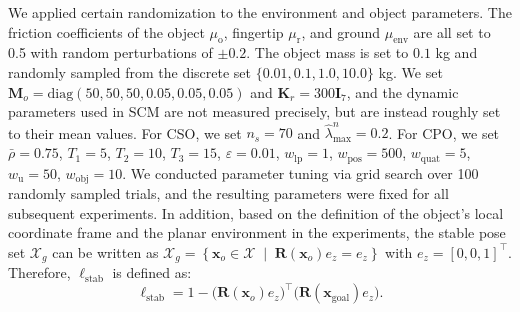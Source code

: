 We applied certain randomization to the environment and object parameters. The friction coefficients of the object $\mu_{\text{o}}$, fingertip $\mu_{\text{r}}$, and ground $\mu_{\text{env}}$ are all set to 0.5 with random perturbations of $\pm 0.2$. The object mass is set to $0.1$ kg and randomly sampled from the discrete set
$\{0.01,0.1,1.0,10.0\}$ kg. We set $\boldsymbol{M}_o=\text{diag}(50,50,50,0.05,0.05,0.05)$ and $\boldsymbol{K}_r=300 \boldsymbol{I}_7$, and the dynamic parameters used in SCM are not measured precisely, but are instead roughly set to their mean values. For CSO, we set $n_s=70$ and $\hat{\lambda}^n_{\text{max}}=0.2$. For CPO, we set $\bar{\rho}=0.75$, $T_1=5$, $T_2=10$, $T_3=15$, $\varepsilon=0.01$, $w_{\text{lp}}=1$, $w_{\text{pos}}=500$, $w_{\text{quat}}=5$, $w_\text{u}=50$, $w_{\text{obj}}=10$. We conducted parameter tuning via grid search over 100 randomly sampled trials, and the resulting parameters were fixed for all subsequent experiments. In addition, based on the definition of the object’s local coordinate frame and the planar environment in the experiments, the stable pose set $\mathcal{X}_g$ can be written as $\mathcal{X}_g=\left\{\boldsymbol{x}_o\in\mathcal{X}\;\middle|\;\boldsymbol{R}\left(\boldsymbol{x}_o\right)e_z=e_z\right\}
$ with $e_z=[0, 0, 1]^\top$. Therefore, $\ell_{\text{stab}}$ is defined as:
\begin{equation}
    \ell_{\text{stab}}=1-\bigl(\boldsymbol{R}(\boldsymbol{x}_o)e_z\bigr)^\top\bigl(\boldsymbol{R}(\boldsymbol{x}_{\text{goal}})e_z\bigr).
\end{equation}

